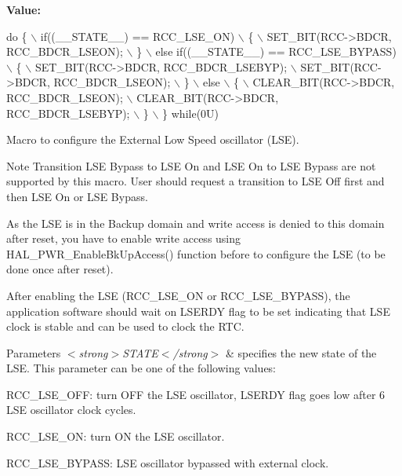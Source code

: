 {\bfseries Value\+:}
\begin{DoxyCode}
\textcolor{keywordflow}{do} \{                                       \(\backslash\)
                      if((\_\_STATE\_\_) == RCC\_LSE\_ON)            \(\backslash\)
                      \{                                        \(\backslash\)
                        SET\_BIT(RCC->BDCR, RCC\_BDCR\_LSEON);    \(\backslash\)
                      \}                                        \(\backslash\)
                      else \textcolor{keywordflow}{if}((\_\_STATE\_\_) == RCC\_LSE\_BYPASS)   \(\backslash\)
                      \{                                        \(\backslash\)
                        SET\_BIT(RCC->BDCR, RCC\_BDCR\_LSEBYP);   \(\backslash\)
                        SET\_BIT(RCC->BDCR, RCC\_BDCR\_LSEON);    \(\backslash\)
                      \}                                        \(\backslash\)
                      else                                     \(\backslash\)
                      \{                                        \(\backslash\)
                        CLEAR\_BIT(RCC->BDCR, RCC\_BDCR\_LSEON);  \(\backslash\)
                        CLEAR\_BIT(RCC->BDCR, RCC\_BDCR\_LSEBYP); \(\backslash\)
                      \}                                        \(\backslash\)
                    \} \textcolor{keywordflow}{while}(0U)
\end{DoxyCode}


Macro to configure the External Low Speed oscillator (L\+SE). 

\begin{DoxyNote}{Note}
Transition L\+SE Bypass to L\+SE On and L\+SE On to L\+SE Bypass are not supported by this macro. User should request a transition to L\+SE Off first and then L\+SE On or L\+SE Bypass. 

As the L\+SE is in the Backup domain and write access is denied to this domain after reset, you have to enable write access using H\+A\+L\+\_\+\+P\+W\+R\+\_\+\+Enable\+Bk\+Up\+Access() function before to configure the L\+SE (to be done once after reset). 

After enabling the L\+SE (R\+C\+C\+\_\+\+L\+S\+E\+\_\+\+ON or R\+C\+C\+\_\+\+L\+S\+E\+\_\+\+B\+Y\+P\+A\+SS), the application software should wait on L\+S\+E\+R\+DY flag to be set indicating that L\+SE clock is stable and can be used to clock the R\+TC. 
\end{DoxyNote}

\begin{DoxyParams}{Parameters}
{\em $<$strong$>$\+S\+T\+A\+T\+E$<$/strong$>$} & specifies the new state of the L\+SE. This parameter can be one of the following values\+: \begin{DoxyItemize}
\item R\+C\+C\+\_\+\+L\+S\+E\+\_\+\+O\+FF\+: turn O\+FF the L\+SE oscillator, L\+S\+E\+R\+DY flag goes low after 6 L\+SE oscillator clock cycles. \item R\+C\+C\+\_\+\+L\+S\+E\+\_\+\+ON\+: turn ON the L\+SE oscillator. \item R\+C\+C\+\_\+\+L\+S\+E\+\_\+\+B\+Y\+P\+A\+SS\+: L\+SE oscillator bypassed with external clock. \end{DoxyItemize}
\\
\hline
\end{DoxyParams}
